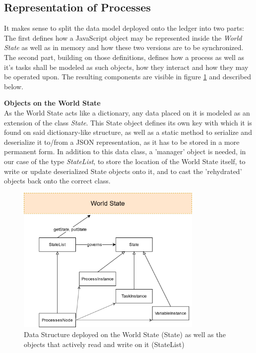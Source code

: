 \subsection{Representation of Processes}
\label{sec:impr:hl:datastructure}

It makes sense to split the data model deployed onto the ledger into two parts: The first defines how a JavaScript object may be represented inside the \emph{World State} as well as in memory and how these two versions are to be synchronized. The second part, building on those definitions, defines how a process as well as it's tasks shall be modeled as such objects, how they interact and how they may be operated upon. The resulting components are visible in figure \ref{fig:impr:hl:data} and described below.

\textbf{Objects on the World State} \\[0.2em]
As the World State acts like a dictionary, any data placed on it is modeled as an extension of the class \emph{State}. This State object defines its own key with which it is found on said dictionary-like structure, as well as a static method to serialize and deserialize it to/from a JSON representation, as it has to be stored in a more permanent form. \newline
In addition to this data class, a 'manager' object is needed, in our case of the type \emph{StateList}, to store the location of the World State itself, to write or update deserialized State objects onto it, and to cast the 'rehydrated' objects back onto the correct class.

\begin{figure}[h]
	\centering
	\captionsetup{justification=centering,margin=2cm}
	\includegraphics[width=0.8\textwidth]{gfx/hl-data}
	\caption{Data Structure deployed on the World State (State) as well as the objects that actively read and write on it (StateList)}
	\label{fig:impr:hl:data}
\end{figure}

